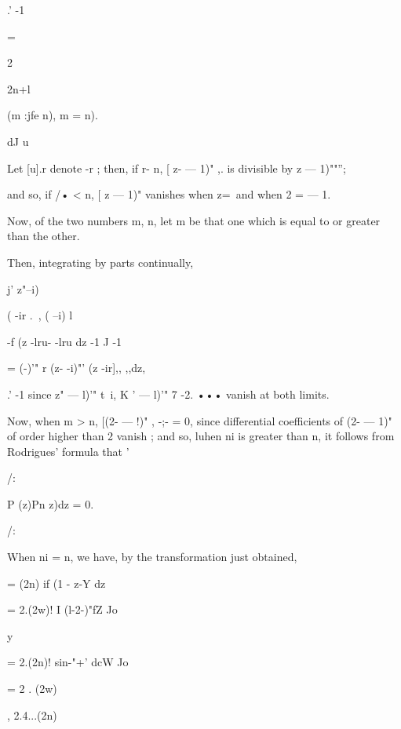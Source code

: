 {.' -1



=



2

2n+l



(m :jfe n), m = n).



dJ u



Let [u].r denote -r ; then, if r- n, [ z- — 1)" ,. is divisible by z —
1)""'';

and so, if /• < n, [ z — 1)" vanishes when z=\ and when 2 = — 1.

Now, of the two numbers m, n, let m be that one which is equal to or
greater than the other.

Then, integrating by parts continually,



j' z"--i)%



 ( -ir .\ , ( --i) l



-f (z -lru- -lru dz -1 J -1



= (-)'" r (z- -i)"' (z -ir],, ,,dz,

.' -1 since z" — l)'" t\ i, K ' — l)'" 7 -2. ••• vanish at both
limits.

Now, when m > n, [(2- — !)" , -;- = 0, since differential coefficients
of (2- — 1)" of order higher than 2 vanish ; and so, luhen ni is
greater than n, it follows from Rodrigues' formula that '



/:



P (z)Pn z)dz = 0.



/:



When ni = n, we have, by the transformation just obtained,

= (2n) if (1 - z-Y dz

= 2.(2w)! I (l-2-)"fZ Jo



y



= 2.(2n)! sin-"+' dcW Jo



= 2 . (2w)



, 2.4...(2n)



}
